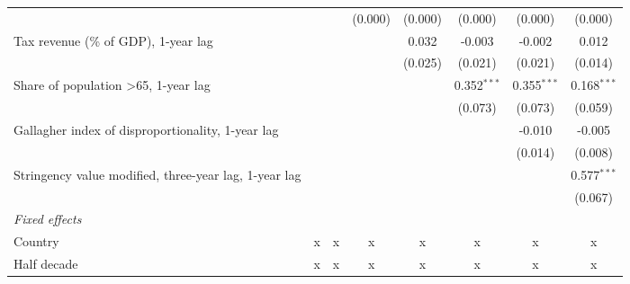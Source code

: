 \begin{tabular}{lccccccc}
                                                                                             &         &         & (0.000)      & (0.000)       & (0.000)       & (0.000)       & (0.000)\\   
   Tax revenue (\% of GDP), 1-year lag                                                       &         &         &              & 0.032         & -0.003        & -0.002        & 0.012\\   
                                                                                             &         &         &              & (0.025)       & (0.021)       & (0.021)       & (0.014)\\   
   Share of population >65, 1-year lag                                                       &         &         &              &               & 0.352$^{***}$ & 0.355$^{***}$ & 0.168$^{***}$\\   
                                                                                             &         &         &              &               & (0.073)       & (0.073)       & (0.059)\\   
   Gallagher index of disproportionality, 1-year lag                                         &         &         &              &               &               & -0.010        & -0.005\\   
                                                                                             &         &         &              &               &               & (0.014)       & (0.008)\\   
   Stringency value modified, three-year lag, 1-year lag                                     &         &         &              &               &               &               & 0.577$^{***}$\\   
                                                                                             &         &         &              &               &               &               & (0.067)\\   
   \emph{Fixed effects}\\
   Country                                                                                   & x       & x       & x            & x             & x             & x             & x\\  
   Half decade                                                                               & x       & x       & x            & x             & x             & x             & x\\  

\end{tabular}
